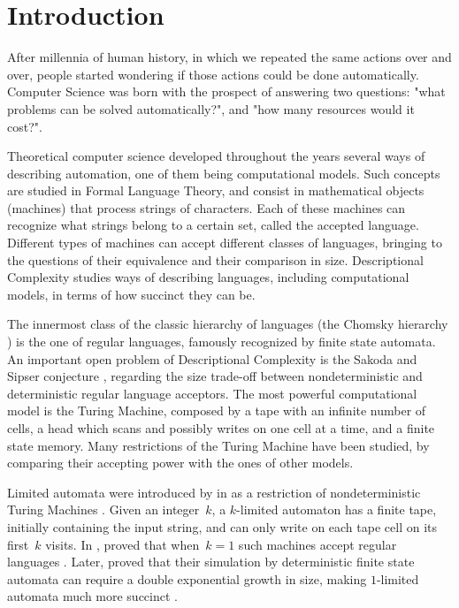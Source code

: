 \chapter{Introduction}
After millennia of human history, in which we repeated the same actions over and over, people started wondering if those actions could be done automatically.
Computer Science was born with the prospect of answering two questions: "what problems can be solved automatically?", and "how many resources would it cost?".

Theoretical computer science developed throughout the years several ways of describing automation, one of them being computational models.
Such concepts are studied in Formal Language Theory, and consist in mathematical objects (machines) that process strings of characters.
Each of these machines can recognize what strings belong to a certain set, called the accepted language.
Different types of machines can accept different classes of languages, bringing to the questions of their equivalence and their comparison in size.
Descriptional Complexity studies ways of describing languages, including computational models, in terms of how succinct they can be.

The innermost class of the classic hierarchy of languages (the Chomsky hierarchy \cite{Cho56}) is the one of regular languages, famously recognized by finite state automata.
An important open problem of Descriptional Complexity is the Sakoda and Sipser conjecture \cite{SakSip78}, regarding the size trade-off between nondeterministic and deterministic regular language acceptors.
The most powerful computational model is the Turing Machine, composed by a tape with an infinite number of cells, a head which scans and possibly writes on one cell at a time, and a finite state memory.
Many restrictions of the Turing Machine have been studied, by comparing their accepting power with the ones of other models.

Limited automata were introduced by \citeauthor{Hib67} in \citeyear{Hib67} as a restriction of nondeterministic Turing Machines \cite{Hib67}.
Given an integer~$k$, a $k$-limited automaton has a finite tape, initially containing the input string, and can only write on each tape cell on its first~$k$ visits.
In \citeyear{WagWec86}, \citeauthor{WagWec86} proved that when~$k=1$ such machines accept regular languages \cite{WagWec86}.
Later, \citeauthor{PigPis14} proved that their simulation by deterministic finite state automata can require a double exponential growth in size, making $1$-limited automata much more succinct \cite{PigPis14}.

